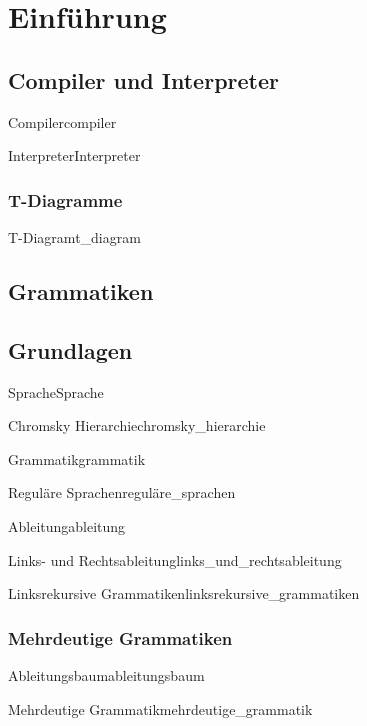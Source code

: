 \chapter{Einführung}
\label{ch:einführung}

\section{Compiler und Interpreter}
\begin{Definition}{Compiler}{compiler}
\end{Definition}
\begin{Definition}{Interpreter}{Interpreter}
\end{Definition}
\subsection{T-Diagramme}
\begin{Definition}{T-Diagram}{t_diagram}
\end{Definition}
\section{Grammatiken}
\section{Grundlagen}
\begin{Definition}{Sprache}{Sprache}
\end{Definition}
\begin{Definition}{Chromsky Hierarchie}{chromsky_hierarchie}
\end{Definition}
\begin{Definition}{Grammatik}{grammatik}
\end{Definition}
\begin{Definition}{Reguläre Sprachen}{reguläre_sprachen}
\end{Definition}
\begin{Definition}{Ableitung}{ableitung}
\end{Definition}
\begin{Definition}{Links- und Rechtsableitung}{links_und_rechtsableitung}
\end{Definition}
\begin{Definition}{Linksrekursive Grammatiken}{linksrekursive_grammatiken}
\end{Definition}
\subsection{Mehrdeutige Grammatiken}
\begin{Definition}{Ableitungsbaum}{ableitungsbaum}
\end{Definition}
\begin{Definition}{Mehrdeutige Grammatik}{mehrdeutige_grammatik}
\end{Definition}
